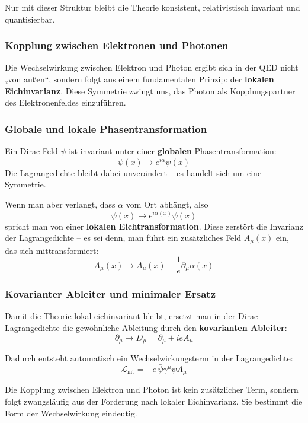 Nur mit dieser Struktur bleibt die Theorie konsistent, relativistisch invariant und quantisierbar.

\subsubsection{Kopplung zwischen Elektronen und Photonen}

Die Wechselwirkung zwischen Elektron und Photon ergibt sich in der QED nicht „von außen“, sondern folgt aus einem fundamentalen Prinzip: der \textbf{lokalen Eichinvarianz}. Diese Symmetrie zwingt uns, das Photon als Kopplungspartner des Elektronenfeldes einzuführen.

\subsubsection*{Globale und lokale Phasentransformation}
Ein Dirac-Feld $\psi$ ist invariant unter einer \textbf{globalen} Phasentransformation:
\[
\psi(x) \rightarrow e^{i\alpha} \psi(x)
\]
Die Lagrangedichte bleibt dabei unverändert – es handelt sich um eine Symmetrie.

Wenn man aber verlangt, dass $\alpha$ vom Ort abhängt, also
\[
\psi(x) \rightarrow e^{i\alpha(x)} \psi(x)
\]
spricht man von einer \textbf{lokalen Eichtransformation}. Diese zerstört die Invarianz der Lagrangedichte – es sei denn, man führt ein zusätzliches Feld $A_\mu(x)$ ein, das sich mittransformiert:
\[
A_\mu(x) \rightarrow A_\mu(x) - \frac{1}{e} \partial_\mu \alpha(x)
\]

\subsubsection*{Kovarianter Ableiter und minimaler Ersatz}
Damit die Theorie lokal eichinvariant bleibt, ersetzt man in der Dirac-Lagrangedichte die gewöhnliche Ableitung durch den \textbf{kovarianten Ableiter}:
\[
\partial_\mu \rightarrow D_\mu = \partial_\mu + ie A_\mu
\]

Dadurch entsteht automatisch ein Wechselwirkungsterm in der Lagrangedichte:
\[
\mathcal{L}_{\text{int}} = -e \, \bar{\psi} \gamma^\mu \psi A_\mu
\]

\vspace{0.5em}
\begin{tcolorbox}[mathebox, title=Kopplung aus Prinzip]
	\label{box:Kopplung aus Prinzip}
	Die Kopplung zwischen Elektron und Photon ist kein zusätzlicher Term, sondern folgt zwangsläufig aus der Forderung nach lokaler Eichinvarianz. Sie bestimmt die Form der Wechselwirkung eindeutig.
\end{tcolorbox}

